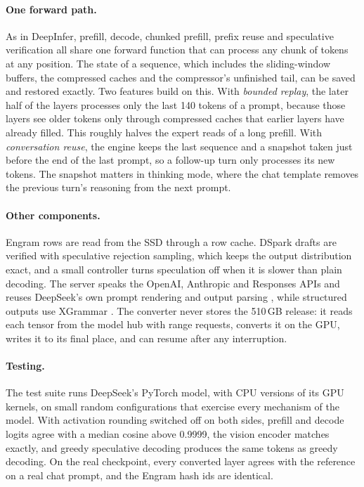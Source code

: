 \paragraph{One forward path.} As in DeepInfer, prefill, decode, chunked prefill, prefix reuse and speculative verification all share one forward function that can process any chunk of tokens at any position. The state of a sequence, which includes the sliding-window buffers, the compressed caches and the compressor's unfinished tail, can be saved and restored exactly. Two features build on this. With \emph{bounded replay}, the later half of the layers processes only the last 140 tokens of a prompt, because those layers see older tokens only through compressed caches that earlier layers have already filled. This roughly halves the expert reads of a long prefill. With \emph{conversation reuse}, the engine keeps the last sequence and a snapshot taken just before the end of the last prompt, so a follow-up turn only processes its new tokens. The snapshot matters in thinking mode, where the chat template removes the previous turn's reasoning from the next prompt.

\paragraph{Other components.} Engram rows are read from the SSD through a row cache. DSpark drafts are verified with speculative rejection sampling, which keeps the output distribution exact, and a small controller turns speculation off when it is slower than plain decoding. The server speaks the OpenAI, Anthropic and Responses APIs and reuses DeepSeek's own prompt rendering and output parsing \citep{deepseekrecipe}, while structured outputs use XGrammar \citep{xgrammar}. The converter never stores the 510\,GB release: it reads each tensor from the model hub with range requests, converts it on the GPU, writes it to its final place, and can resume after any interruption.

\paragraph{Testing.} The test suite runs DeepSeek's PyTorch model, with CPU versions of its GPU kernels, on small random configurations that exercise every mechanism of the model. With activation rounding switched off on both sides, prefill and decode logits agree with a median cosine above 0.9999, the vision encoder matches exactly, and greedy speculative decoding produces the same tokens as greedy decoding. On the real checkpoint, every converted layer agrees with the reference on a real chat prompt, and the Engram hash ids are identical.
